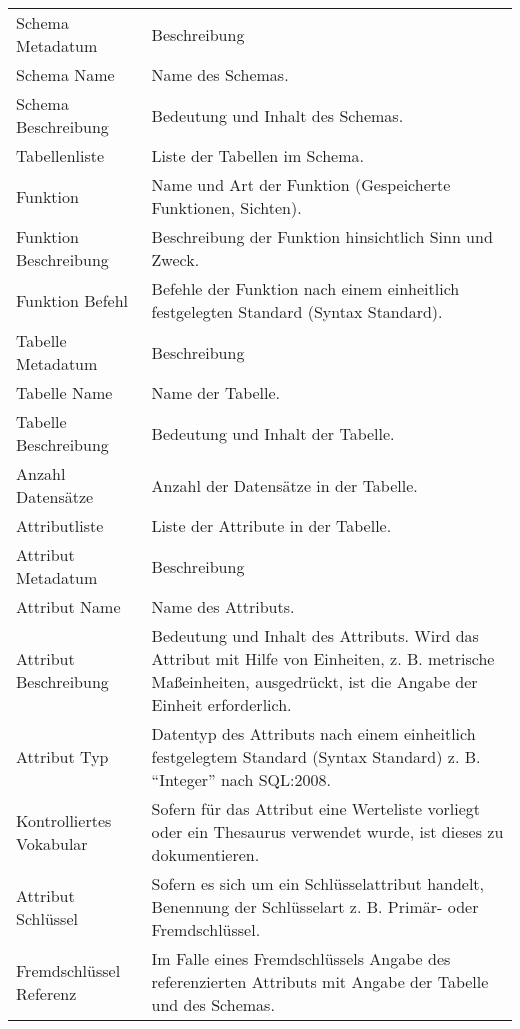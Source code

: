\begin{center}
\begin{longtable}{L{0.3\textwidth} p{0.6\textwidth}}
		\midrule
		Schema Metadatum & Beschreibung\\
		Schema Name & Name des Schemas.\\
		Schema Beschreibung & Bedeutung und Inhalt des Schemas.\\
		Tabellenliste & Liste der Tabellen im Schema.\\
		Funktion & Name und Art der Funktion (Gespeicherte Funktionen, Sichten).\\
		Funktion Beschreibung & Beschreibung der Funktion hinsichtlich Sinn und Zweck.\\
		Funktion Befehl & Befehle der Funktion nach einem einheitlich festgelegten Standard (Syntax Standard).\\
		\midrule
		Tabelle Metadatum & Beschreibung\\
		Tabelle Name & Name der Tabelle.\\
		Tabelle Beschreibung & Bedeutung und Inhalt der Tabelle.\\
		Anzahl Datensätze & Anzahl der Datensätze in der Tabelle.\\
		Attributliste & Liste der Attribute in der Tabelle.\\
		\midrule
		Attribut Metadatum & Beschreibung\\
		Attribut Name & Name des Attributs.\\
		Attribut Beschreibung & Bedeutung und Inhalt des Attributs. Wird das Attribut mit Hilfe von Einheiten, z. B. metrische Maßeinheiten, ausgedrückt, ist die Angabe der Einheit erforderlich.\\
		Attribut Typ & Datentyp des Attributs nach einem einheitlich festgelegtem Standard (Syntax Standard) z. B. "`Integer"' nach SQL:2008.\\
		Kontrolliertes Vokabular & Sofern für das Attribut eine Werteliste vorliegt oder ein Thesaurus verwendet wurde, ist dieses zu dokumentieren.\\
		Attribut Schlüssel & Sofern es sich um ein Schlüsselattribut handelt, Benennung der Schlüsselart z. B. Primär- oder Fremdschlüssel. \\
		Fremdschlüssel Referenz & Im Falle eines Fremdschlüssels Angabe des referenzierten Attributs mit Angabe der Tabelle und des Schemas. \\

	  \bottomrule
	\end{longtable}
\end{center}